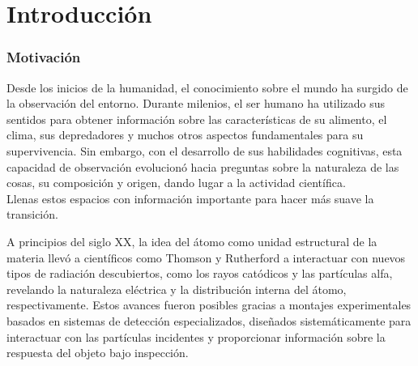 \documentclass[]{book}
\begin{document}
\chapter{Introducción}

\subsection{Motivación}

Desde los inicios de la humanidad, el conocimiento sobre el mundo ha surgido de la observación del entorno. Durante milenios, el ser humano ha utilizado sus sentidos para obtener información sobre las características de su alimento, el clima, sus depredadores y muchos otros aspectos fundamentales para su supervivencia. Sin embargo, con el desarrollo de sus habilidades cognitivas, esta capacidad de observación evolucionó hacia preguntas sobre la naturaleza de las cosas, su composición y origen, dando lugar a la actividad científica.\\ Llenas estos espacios con información importante para hacer más suave la transición.


\noindent A principios del siglo XX, la idea del átomo como unidad estructural de la materia llevó a científicos como Thomson y Rutherford a interactuar con nuevos tipos de radiación descubiertos, como los rayos catódicos y las partículas alfa, revelando la naturaleza eléctrica y la distribución interna del átomo, respectivamente. Estos avances fueron posibles gracias a montajes experimentales basados en sistemas de detección especializados, diseñados sistemáticamente para interactuar con las partículas incidentes y proporcionar información sobre la respuesta del objeto bajo inspección. \\

\end{document}
